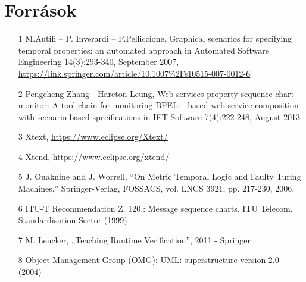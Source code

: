 \chapter{Források}
\begin{itemize}
    \item [1] M.Autili – P. Inverardi – P.Pelliccione, Graphical scenarios for specifying temporal properties: an automated approach in Automated Software Engineering 14(3):293-340, September
2007, \url{https://link.springer.com/article/10.1007%2Fs10515-007-0012-6}
    \item [2] Pengcheng Zhang - Hareton Leung, Web services property sequence chart monitor: A tool chain for monitoring BPEL – based web service composition with scenario-based specifications in IET Software 7(4):222-248, August
2013
    \item [3] Xtext, \url{https://www.eclipse.org/Xtext/}
    \item [4] Xtend, \url{https://www.eclipse.org/xtend/}
    \item [5] J. Ouaknine and J. Worrell, “On Metric Temporal Logic and Faulty Turing Machines,” Springer-Verlag, FOSSACS, vol. LNCS 3921, pp. 217-230, 2006.
    \item [6] ITU-T Recommendation Z. 120.: Message sequence charts. ITU Telecom. Standardisation Sector (1999)
    \item [7] M. Leucker, „Teaching Runtime Verification”, 2011 - Springer
    \item [8] Object Management Group (OMG): UML: superstructure version 2.0 (2004)
\end{itemize}